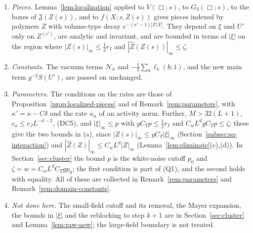 \begin{remark}\label{rem:step-quantities-output}
\begin{enumerate}[label=(\alph*)]
\item \emph{Pieces.} Lemma~\ref{lem:localization} applied to $V(\Box;s)$, to $G_3(\Box;s)$, to the boxes of $\mathfrak J(Z(s))$, and to $f(X;s,Z(s))$ gives pieces indexed by polymers $Z$ with volume-type decay $e^{-(\kappa'-1)|Z\setminus Y|}$. They depend on $\xi$ and $U'$ only on $Z^{(r')}$, are analytic and invariant, and are bounded in terms of $|\xi|$ on the region where $|Z(s)|_\infty\le\frac12r_I$ and $|\hat Z(Z(s))|_\infty\le\zeta$.
\item \emph{Constants.} The vacuum terms $\mathcal N_k$ and $-\frac12\sum_b\ell_k(b;1)$, and the new main term $g^{-2}S(U')$, are passed on unchanged.
\item \emph{Parameters.} The conditions on the rates are those of Proposition~\ref{prop:localized-pieces} and of Remark~\ref{rem:parameters}, with $\kappa'=\kappa-C\delta$ and the rate $\kappa_n$ of an activity norm. Further, $M>32(L+1)$, $c_a\le c_JL^{-d-2}$, (DC5), and $|\xi|_\infty\le p$ with $gC_Tp\le\frac12r_I$ and $C_wL^dgC_Tp\le\zeta$; these give the two bounds in (a), since $|Z(s)|_\infty\le gC_T|\xi|_\infty$ (Section~\ref{subsec:sq-interaction}) and $|\hat Z(Z)|_\infty\le C_wL^d|Z|_\infty$ (Lemma~\ref{lem:eliminate}(c),(d)). In Section~\ref{sec:cluster} the bound $p$ is the white-noise cutoff $p_0$ and $\zeta=w=C_wL^dC_Tgp_0$; the first condition is part of (Q1), and the second holds with equality. All of these are collected in Remark~\ref{rem:parameters} and Remark~\ref{rem:domain-constants}.
\item \emph{Not done here.} The small-field cutoff and its removal, the Mayer expansion, the bounds in $|\xi|$ and the reblocking to step $k+1$ are in Section~\ref{sec:cluster} and Lemma~\ref{lem:raw-new}; the large-field boundary is not treated.
\end{enumerate}
\end{remark}

